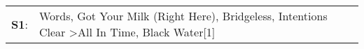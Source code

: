 \begin{supertabular}{p{0.03\textwidth}p{0.92\textwidth}}
 \textbf{S1}:  &  Words\textsuperscript{}, \enspace Got Your Milk (Right Here)\textsuperscript{}, \enspace Bridgeless\textsuperscript{}, \enspace Intentions Clear\textsuperscript{} \textgreater \enspace All In Time\textsuperscript{}, \enspace Black Water[1]\textsuperscript{}  \enspace  \\
\end{supertabular}
